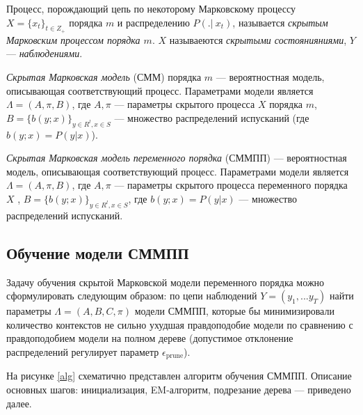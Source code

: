 \documentclass{matmex-diploma-custom}
\begin{document}
\begin{definition}
Процесс, порождающий цепь по некоторому Марковскому процессу $X = \{x_{t}\}_{t \in Z_{+}}$ порядка $m$ и распределению $P(.|~x_{t})$, называется \textit{скрытым Марковским процессом порядка $m$}. 
$ X $ называеются \textit{скрытыми состоянияниями}, $Y$ --- \textit{наблюдениями}.
\end{definition}

\begin{definition}
\textit{Скрытая Марковская модель} (СММ) порядка $ m $ --- вероятностная модель, описывающая соответствующий процесс. Параметрами модели является $\Lambda=(A,\pi,B)$, где $A,\pi$ --- параметры скрытого процесса $X$ порядка $m$,  $ B = \{b(y; x)\}_{y \in R^{l}, x \in S}$ ---  множество распределений испусканий (где $ b(y; x) = P(y|x)$). 
\end{definition}

\begin{definition}
\textit{Скрытая Марковская модель переменного порядка} (СММПП) --- вероятностная модель, описывающая соответствующий процесс. Параметрами модели является $\Lambda=(A,\pi,B)$, где $A,\pi$ --- параметры скрытого процесса переменного порядка $X$ ,  $ B = \{b(y; x)\}_{y \in R^{l}, x \in S}$, где $ b(y; x) = P(y|x)$ ---  множество распределений испусканий. 
\end{definition}


\subsection{Обучение модели СММПП}
Задачу обучения скрытой Марковской модели переменного порядка можно сформулировать следующим образом: 
по цепи наблюдений $ Y = (y_{1}, ... y_{T}) $ найти параметры $\Lambda = (A,B,C,\pi)$ модели СММПП, которые бы минимизировали количество контекстов не сильно ухудшая правдоподобие модели по сравнению с правдоподобием модели на полном дереве (допустимое отклонение распределений регулирует параметр $ \epsilon_{\text{prune}} $).

На рисунке \ref{alg} схематично представлен алгоритм обучения СММПП. Описание основных шагов: инициализация, EM-алгоритм, подрезание дерева --- приведено далее.
\\
\end{document}
